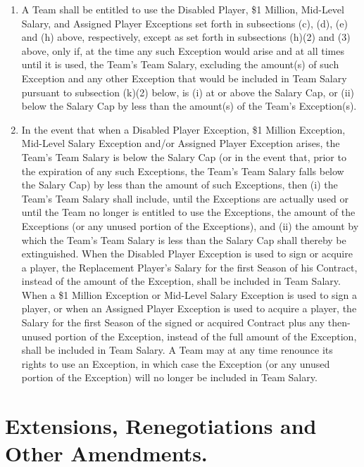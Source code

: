 \documentclass[
]{book}
\providecommand{\tightlist}{%
  \setlength{\itemsep}{0pt}\setlength{\parskip}{0pt}}
\begin{document}
\begin{enumerate}
  \begin{enumerate}
  \def\labelenumii{(\arabic{enumii})}
  \tightlist
  \item
    A Team shall be entitled to use the Disabled Player, \$1 Million, Mid-Level Salary, and Assigned Player Exceptions set forth in subsections (c), (d), (e) and (h) above, respectively, except as set forth in subsections (h)(2) and (3) above, only if, at the time any such Exception would arise and at all times until it is used, the Team's Team Salary, excluding the amount(s) of such Exception and any other Exception that would be included in Team Salary pursuant to subsection (k)(2) below, is (i) at or above the Salary Cap, or (ii) below the Salary Cap by less than the amount(s) of the Team's Exception(s).
  \item
    In the event that when a Disabled Player Exception, \$1 Million Exception, Mid-Level Salary Exception and/or Assigned Player Exception arises, the Team's Team Salary is below the Salary Cap (or in the event that, prior to the expiration of any such Exceptions, the Team's Team Salary falls below the Salary Cap) by less than the amount of such Exceptions, then (i) the Team's Team Salary shall include, until the Exceptions are actually used or until the Team no longer is entitled to use the Exceptions, the amount of the Exceptions (or any unused portion of the Exceptions), and (ii) the amount by which the Team's Team Salary is less than the Salary Cap shall thereby be extinguished. When the Disabled Player Exception is used to sign or acquire a player, the Replacement Player's Salary for the first Season of his Contract, instead of the amount of the Exception, shall be included in Team Salary. When a \$1 Million Exception or Mid-Level Salary Exception is used to sign a player, or when an Assigned Player Exception is used to acquire a player, the Salary for the first Season of the signed or acquired Contract plus any then-unused portion of the Exception, instead of the full amount of the Exception, shall be included in Team Salary. A Team may at any time renounce its rights to use an Exception, in which case the Exception (or any unused portion of the Exception) will no longer be included in Team Salary.
  \end{enumerate}
\end{enumerate}

\hypertarget{extensions-renegotiations-and-other-amendments.}{%
\section{Extensions, Renegotiations and Other Amendments.}\label{extensions-renegotiations-and-other-amendments.}}
\end{document}
